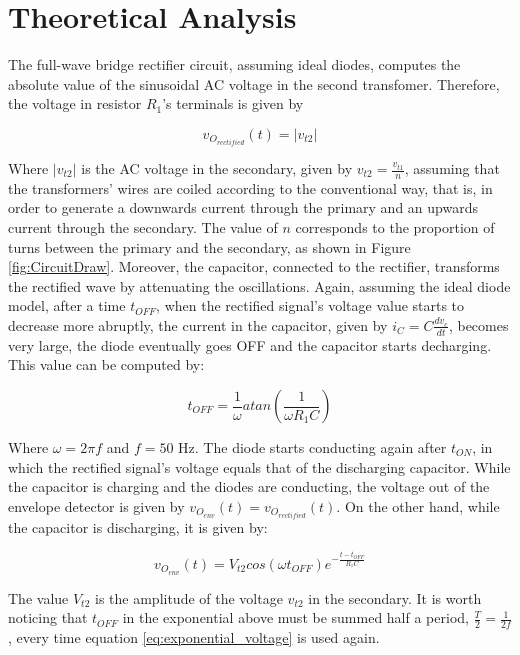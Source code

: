 \section{Theoretical Analysis} \label{sec:analysis}

The full-wave bridge rectifier circuit, assuming ideal diodes, computes the absolute value of the sinusoidal AC voltage in the second transfomer. Therefore, the voltage in resistor $R_1$'s terminals is given by

\begin{equation} \label{eq:rectified_voltage}
  v_{O_{rectified}}(t)=|v_{t2}|
\end{equation}

Where $|v_{t2}|$ is the AC voltage in the secondary, given by $v_{t2}=\frac{v_{t1}}{n}$, assuming that the transformers' wires are coiled according to the conventional way, that is, in order to generate a downwards current through the primary and an upwards current through the secondary. The value of $n$ corresponds to the proportion of turns between the primary and the secondary, as shown in Figure \ref{fig:CircuitDraw}. Moreover, the capacitor, connected to the rectifier, transforms the rectified wave by attenuating the oscillations. Again, assuming the ideal diode model, after a time $t_{OFF}$, when the rectified signal's voltage value starts to decrease more abruptly, the current in the capacitor, given by $i_C=C\frac{dv_c}{dt}$, becomes very large, the diode eventually goes OFF and the capacitor starts decharging. This value can be computed by:

\begin{equation} \label{eq:toff}
  t_{OFF}=\frac{1}{\omega}atan\left(\frac{1}{\omega R_1C}\right)
\end{equation}

Where $\omega=2\pi f$ and $f=50$ Hz. The diode starts conducting again after $t_{ON}$, in which the rectified signal's voltage equals that of the discharging capacitor. While the capacitor is charging and the diodes are conducting, the voltage out of the envelope detector is given by $v_{O_{env}}(t)=v_{O_{rectified}}(t)$. On the other hand, while the capacitor is discharging, it is given by:

\begin{equation} \label{eq:exponential_voltage}
  v_{O_{env}}(t)=V_{t2}cos(\omega t_{OFF})e^{-\frac{t-t_{OFF}}{R_1C}}
\end{equation}

The value $V_{t2}$ is the amplitude of the voltage $v_{t2}$ in the secondary. It is worth noticing that $t_{OFF}$ in the exponential above must be summed half a period, $\frac{T}{2}=\frac{1}{2f}$, every time equation \ref{eq:exponential_voltage} is used again.

